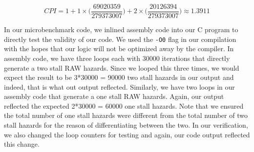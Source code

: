 \documentclass[12pt]{article}
\begin{document}
\begin{singlespace}
$$
CPI = 1+1\times\Big(\frac{69020359}{279373007}\Big)+2\times\Big(\frac{20126394}{279373007}\Big)
    \approx 1.3911
$$

In our microbenchmark code, we inlined assembly code into our C program to directly test the validity of our code. We used the \texttt{-O0} flag in our compilation with the hopes that our logic will not be optimized away by the compiler. In assembly code, we have three loops each with 30000 iterations that directly generate a two stall RAW hazards. Since we looped this three times, we would expect the result to be 3*30000 = 90000 two stall hazards in our output and indeed, that is what out output reflected. Similarly, we have two loops in our assembly code that generate a one stall RAW hazards. Again, our output reflected the expected 2*30000 = 60000 one stall hazards. Note that we ensured the total number of one stall hazards were different from the total number of two stall hazards for the reason of differentiating between the two. In our verification, we also changed the loop counters for testing and again, our code output reflected this change.

\end{singlespace}
\end{document}

